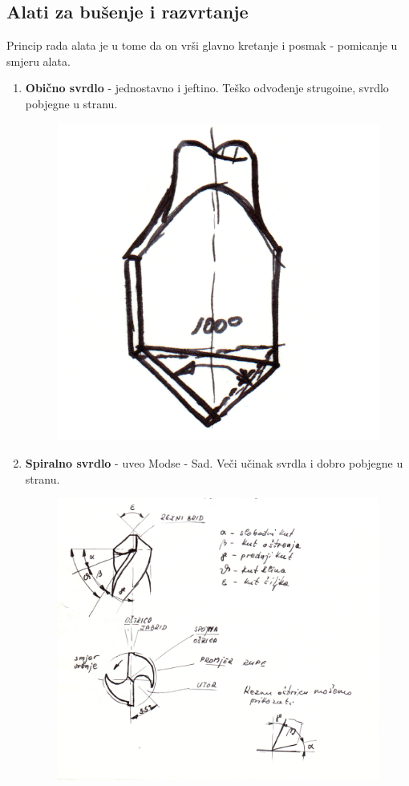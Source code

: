 \documentclass[a4paper,12pt]{article}
\numberwithin{figure}{section}
\begin{document}
\subsection{Alati za bušenje i razvrtanje}
Princip rada alata je u tome da on vrši glavno kretanje i posmak - pomicanje u smjeru alata.
\begin{enumerate}
\item \textbf{Obično svrdlo} - jednostavno i jeftino. Teško odvođenje strugoine, svrdlo pobjegne u stranu.
\begin{figure}[!h]
\centering
\includegraphics[scale=0.12]{image_22-1.png}
\end{figure}
\FloatBarrier
\item \textbf{Spiralno svrdlo} - uveo Modse - Sad. Veči učinak svrdla i dobro pobjegne u stranu.
\begin{figure}[!h]
\centering
\includegraphics[scale=0.13]{image_22-2.png}
\end{figure}
\FloatBarrier
\end{enumerate}
\end{document}
